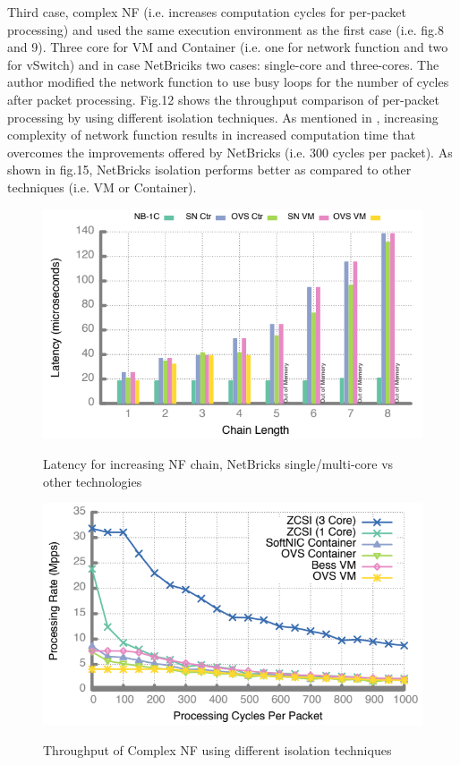 \documentclass[10pt, a4paper, conference]{IEEEtran}
\begin{document}
Third case, complex NF (i.e. increases computation cycles for per-packet processing) and used the same execution environment as the first case (i.e. fig.8 and 9). Three core for VM and Container (i.e. one for network function and two for vSwitch) and in case NetBriciks two cases: single-core and three-cores. The author modified the network function to use busy loops for the number of cycles after packet processing. Fig.12 shows the throughput comparison of per-packet processing by using different isolation techniques. As mentioned in \cite{Panda2016}, increasing complexity of network function results in increased computation time that overcomes the improvements offered by NetBricks (i.e. 300 cycles per packet). As shown in fig.15, NetBricks isolation performs better as compared to other techniques (i.e. VM or Container). 
\begin{figure}
	\centering
	\includegraphics[width=\linewidth]{figures/fig12}
	\caption{Latency for increasing NF chain, NetBricks single/multi-core vs other technologies}
	\cite{Panda2016}
	\label{key14}
\end{figure}
\begin{figure}
	\centering
	\includegraphics[width=\linewidth]{figures/fig13}
	\caption{Throughput of Complex NF using different isolation techniques}
	\cite{Panda2016}
	\label{key15}
\end{figure}
\end{document}

